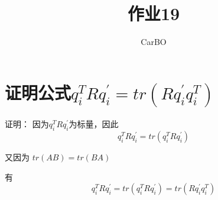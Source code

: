 \documentclass[utf8]{ctexart}
\title{\zihao{1}作业19}
\author{\zihao{-3}CarBO}
\date{}
\begin{document}
\maketitle
    \section{证明公式$q_i^TRq_i^\prime=tr(Rq_i^\prime q_i^T)$}
    证明：
    因为$q_i^TRq_i^\prime$为标量，因此
    \[q_i^TRq_i^\prime=tr(q_i^TRq_i^\prime)\]

    又因为 $tr(AB)=tr(BA)$

    有
    \[q_i^TRq_i^\prime=tr(q_i^TRq_i^\prime)=tr(Rq_i^\prime q_i^T)\]
\end{document}
